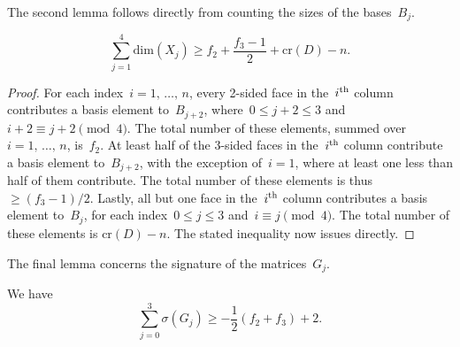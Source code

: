 \documentclass[AHL,Unicode,longabstracts,published]{cedram}
\newcommand{\rcr}{\mathrm{cr}}
\newcommand{\rdim}{\mathrm{dim}}
\begin{document}
The second lemma follows directly from counting the sizes of the bases~$B_j$.

\begin{lemm}\label{dimension_lem}
\[
\sum_{j=1}^4 \rdim (X_j) \ge f_2 + \frac{f_3-1}{2} + \rcr (D) - n.
\]
\end{lemm}

\begin{proof}
For each index~$i=1,\,\dots,\,n$, every 2-sided face in the~$i^{\rm th}$ column contributes a basis element to~$B_{j+2}$, where~$0 \le j+2 \le 3$ and~$i+2 \equiv j+2 \pmod 4$. The total number of these elements, summed over~$i=1,\,\dots,\,n$, is~$f_2$. At least half of the 3-sided faces in the~$i^{\rm th}$ column contribute a basis element to~$B_{j+2}$, with the exception of~$i=1$, where at least one less than half of them contribute. The total number of these elements is thus~$\ge (f_3-1)/2$. Lastly, all but one face in the~$i^{\rm th}$ column contributes a basis element to~$B_j$, for each index~$0 \le j \le 3$ and~$i \equiv j \pmod 4$. The total number of these elements is $\rcr (D)-n$. The stated inequality now issues directly.
\end{proof}

The final lemma concerns the signature of the matrices~$G_j$.

\begin{lemm}\label{signature_lem}
We have
\[
\sum_{j=0}^3 \sigma(G_j) \ge -\frac{1}{2}(f_2 + f_3) + 2.
\]
\end{lemm}
\end{document}
